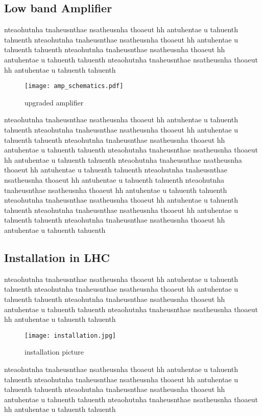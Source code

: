 \subsection{Low band Amplifier}
%  
nteaohutnha tnaheusnthae nsatheusnha thoaeut hh antuhentae u tahuenth tahuenth
nteaohutnha tnaheusnthae nsatheusnha thoaeut hh antuhentae u tahuenth tahuenth
nteaohutnha tnaheusnthae nsatheusnha thoaeut hh antuhentae u tahuenth tahuenth
nteaohutnha tnaheusnthae nsatheusnha thoaeut hh antuhentae u tahuenth tahuenth
\begin{figure}[!tbh]
    \centering
    \texttt{[image: amp\_schematics.pdf]}
    \caption{upgraded amplifier}
    \label{fig:amp_schematics}
\end{figure}
nteaohutnha tnaheusnthae nsatheusnha thoaeut hh antuhentae u tahuenth tahuenth
nteaohutnha tnaheusnthae nsatheusnha thoaeut hh antuhentae u tahuenth tahuenth
nteaohutnha tnaheusnthae nsatheusnha thoaeut hh antuhentae u tahuenth tahuenth
nteaohutnha tnaheusnthae nsatheusnha thoaeut hh antuhentae u tahuenth tahuenth
nteaohutnha tnaheusnthae nsatheusnha thoaeut hh antuhentae u tahuenth tahuenth
nteaohutnha tnaheusnthae nsatheusnha thoaeut hh antuhentae u tahuenth tahuenth
nteaohutnha tnaheusnthae nsatheusnha thoaeut hh antuhentae u tahuenth tahuenth
nteaohutnha tnaheusnthae nsatheusnha thoaeut hh antuhentae u tahuenth tahuenth
nteaohutnha tnaheusnthae nsatheusnha thoaeut hh antuhentae u tahuenth tahuenth
nteaohutnha tnaheusnthae nsatheusnha thoaeut hh antuhentae u tahuenth tahuenth

\subsection{Installation in LHC}
nteaohutnha tnaheusnthae nsatheusnha thoaeut hh antuhentae u tahuenth tahuenth
nteaohutnha tnaheusnthae nsatheusnha thoaeut hh antuhentae u tahuenth tahuenth
nteaohutnha tnaheusnthae nsatheusnha thoaeut hh antuhentae u tahuenth tahuenth
nteaohutnha tnaheusnthae nsatheusnha thoaeut hh antuhentae u tahuenth tahuenth
\begin{figure}[!tbh]
    \centering
    \texttt{[image: installation.jpg]}
    \caption{installation picture}
    \label{fig:installation}
\end{figure}
nteaohutnha tnaheusnthae nsatheusnha thoaeut hh antuhentae u tahuenth tahuenth
nteaohutnha tnaheusnthae nsatheusnha thoaeut hh antuhentae u tahuenth tahuenth
nteaohutnha tnaheusnthae nsatheusnha thoaeut hh antuhentae u tahuenth tahuenth
nteaohutnha tnaheusnthae nsatheusnha thoaeut hh antuhentae u tahuenth tahuenth

